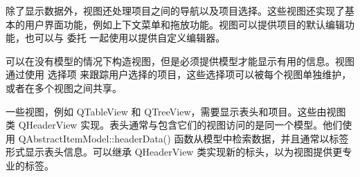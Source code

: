 除了显示数据外，视图还处理项目之间的导航以及项目选择。这些视图还实现了基本的用户界面功能，例如上下文菜单和拖放功能。视图可以提供项目的默认编辑功能，也可以与 委托 一起使用以提供自定义编辑器。

可以在没有模型的情况下构造视图，但是必须提供模型才能显示有用的信息。视图通过使用 选择项 来跟踪用户选择的项目，这些选择项可以被每个视图单独维护，或者在多个视图之间共享。

一些视图，例如 QTableView 和 QTreeView，需要显示表头和项目。这些由视图类 QHeaderView 实现。表头通常与包含它们的视图访问的是同一个模型。他们使用 QAbstractItemModel::headerData() 函数从模型中检索数据，并且通常以标签形式显示表头信息。可以继承 QHeaderView 类实现新的标头，以为视图提供更专业的标签。

